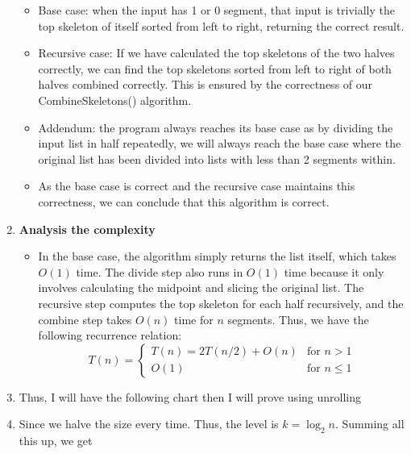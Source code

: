 \documentclass{article}
\begin{document}
\begin{enumerate}[label = \alph*]
\begin{itemize}
			\item Base case: when the input has 1 or 0 segment, that input is trivially the top skeleton of itself sorted from left to right, returning the correct result.
			\item Recursive case: If we have calculated the top skeletons of the two halves correctly, we can find the top skeletons sorted from left to right of both halves combined correctly. This is ensured by the correctness of our CombineSkeletons() algorithm.
			\item Addendum: the program always reaches its base case as by dividing the input list in half repeatedly, we will always reach the base case where the original list has been divided into lists with less than 2 segments within.
			\item As the base case is correct and the recursive case maintains this correctness, we can conclude that this algorithm is correct.
		\end{itemize}
		\item \textbf{Analysis the complexity}
		\begin{itemize}
			\item In the base case, the algorithm simply returns the list itself, which takes \( O(1) \) time. The divide step also runs in \( O(1) \) time because it only involves calculating the midpoint and slicing the original list. The recursive step computes the top skeleton for each half recursively, and the combine step takes \( O(n) \) time for \( n \) segments. Thus, we have the following recurrence relation:
			\[
				T(n) =
				\begin{cases} 
					T(n) = 2T(n/2) + O(n) & \text{for } n > 1 \\
					O(1) & \text{for } n \leq 1 
				\end{cases}
			\]
		\end{itemize}
		\item Thus, I will have the following chart then I will prove using unrolling
		\item Since we halve the size every time. Thus, the level is \(k = \log_2n\). Summing all this up, we get
	\end{enumerate}
\end{document}
